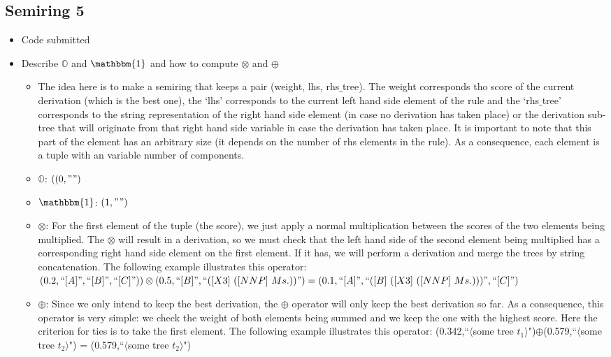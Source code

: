 \documentclass{article}
\begin{document}
\begin{spacing}{1.1}
\subsection{Semiring 5}
\begin{itemize}
	\item Code submitted
	\item Describe $\mathbb{O}$ and $\mathbbm{1}$ and how to compute $\otimes$ and $\oplus$
	\begin{itemize}
		\item The idea here is to make a semiring that keeps a pair (weight, lhs, rhs$\_$tree). The weight corresponds tho score of the current derivation (which is the best one), the `lhs' corresponds to the current left hand side element of the rule and the `rhs$\_$tree' corresponds to the string representation of the right hand side element (in case no derivation has taken place) or the derivation sub-tree that will originate from that right hand side variable in case the derivation has taken place. It is important to note that this part of the element has an arbitrary size (it depends on the number of rhs elements in the rule). As a consequence, each element is a tuple with an variable number of components.
		\item $\mathbb{O}$: $((0,"")$
		\item $\mathbbm{1}$:  $(1,"")$
		\item $\otimes$: For the first element of the tuple (the score), we just apply a normal multiplication between the scores of the two elements being multiplied. The $\otimes$ will result in a derivation, so we must check that the left hand side of the second element being multiplied has a corresponding right hand side element on the first element. If it has, we will perform a derivation and merge the trees by string concatenation. The following example illustrates this operator: $(0.2,``[A]", ``[B]", ``[C]"))\otimes(0.5, ``[B]", ``([X3]\ ([NNP]\ Ms.))") = (0.1,``[A]", ``([B]\ ([X3]\ ([NNP]\ Ms.)))", ``[C]")$
		\item $\oplus$: Since we only intend to keep the best derivation, the $\oplus$ operator will only keep the best derivation so far. As a consequence, this operator is very simple: we check the weight of both elements being summed and we keep the one with the highest score. Here the criterion for ties is to take the first element. The following example illustrates this operator: (0.342,``$\langle$some tree $t_1\rangle$")$\oplus$(0.579,``$\langle$some tree $t_2\rangle$") = (0.579,``$\langle$some tree $t_2\rangle$")

\end{itemize}
\end{itemize}
\end{spacing}
\end{document}
